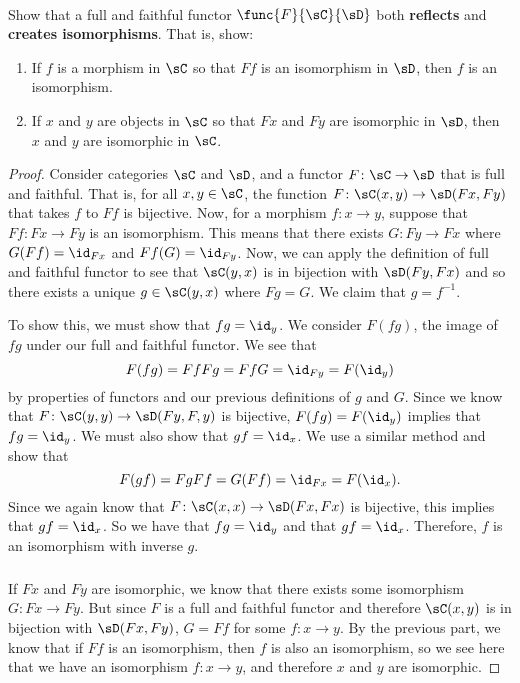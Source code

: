 \documentclass[main.tex]{subfiles}
\begin{document}
\paragraph{}
\begin{exercise}
	Show that a full and faithful functor \(\func{F}{\sC}{\sD}\) both
	\textbf{reflects} and \textbf{creates isomorphisms}. That is, show:
	\begin{enumerate}
		\item If \(f\) is a morphism in \(\sC\) so that \(Ff\) is an isomorphism
			in \(\sD\), then \(f\) is an isomorphism.

		\item If \(x\) and \(y\) are objects in \(\sC\) so that \(Fx\) and
			\(Fy\) are isomorphic in \(\sD\), then \(x\) and \(y\) are
			isomorphic in \(\sC\).
	\end{enumerate}
\end{exercise}
\begin{proof}
	Consider categories $\sC$ and $\sD$, and a functor $F\colon \sC \rightarrow \sD$ that is
	full and faithful. That is, for all $x,y \in \sC$, the function $F\colon \sC(x,y)
	\rightarrow \sD(Fx,Fy)$ that takes $f$ to $Ff$ is bijective. Now, for a
	morphism $f\colon x\rightarrow y$, suppose that $Ff\colon Fx \rightarrow Fy$ is an
	isomorphism. This means that there exists $G\colon Fy \rightarrow Fx$ where
	$G(Ff) = \id_{Fx}$ and $Ff(G) = \id_{Fy}$. Now, we can apply the definition of
	full and faithful functor to see that $\sC(y,x)$ is in bijection with
	$\sD(Fy,Fx)$ and so there exists a unique $g \in \sC(y,x)$ where $Fg = G$. We
	claim that $g = f^{-1}$.

	To show this, we must show that $fg = \id_y$. We consider $F(fg)$, the image
	of $fg$ under our full and faithful functor. We see that
	$$ F(fg) = FfFg = FfG = \id_{Fy} = F(\id_y)$$
	by properties of functors and our previous definitions of $g$ and $G$. Since
	we know that $F\colon \sC(y,y) \rightarrow \sD(Fy,F,y)$ is bijective, $F(fg) =
	F(\id_y)$ implies that $fg = \id_y$. We must also show that $gf = \id_x$. We
	use a similar method and show that
	$$F(gf) = FgFf = G(Ff) = \id_{Fx} = F(\id_x).$$
	Since we again know that $F\colon \sC(x,x) \rightarrow \sD(Fx,Fx)$ is bijective, this
	implies that $gf = \id_x$. So we have that $fg = \id_y$ and that $gf = \id_x$.
	Therefore, $f$ is an isomorphism with inverse $g$.

	\subparagraph{}
	If $Fx$ and $Fy$ are isomorphic, we know that there exists some isomorphism
	$G\colon Fx \rightarrow Fy$. But since $F$ is a full and faithful functor
	and therefore $\sC(x,y)$ is in bijection with $\sD(Fx,Fy)$, $G = Ff$ for
	some $f\colon x \rightarrow y$. By the previous part, we know that if $Ff$
	is an isomorphism, then $f$ is also an isomorphism, so we see here that we
	have an isomorphism $f\colon x \rightarrow y$, and therefore $x$ and $y$ are
	isomorphic.
\end{proof}
\end{document}
